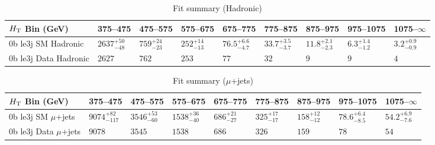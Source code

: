 \documentclass[8pt]{article}
\def\scalht{\mbox{$H_{\rm{T}}$}\xspace}
\newcommand\T{\rule{0pt}{2.6ex}}
\begin{document}
\begin{table}[ht!]
\caption{Fit summary (Hadronic)}
\label{tab:ensemble-summary}
\centering
\begin{tabular}{ lllllllll }

\hline
\scalht Bin (GeV)       & 375--475                       & 475--575                       & 575--675                       & 675--775                       & 775--875                       & 875--975                       & 975--1075                      & 1075--$\infty$                 \\ [1.000000ex]
\hline
0b le3j SM Hadronic\T   & $2637^{+50}_{-48}$             & $759^{+24}_{-23}$              & $252^{+14}_{-13}$              & $76.5^{+6.6}_{-4.7}$           & $33.7^{+3.5}_{-3.7}$           & $11.8^{+2.1}_{-2.3}$           & $6.3^{+1.4}_{-1.2}$            & $3.2^{+0.9}_{-0.9}$            \\ 
0b le3j Data Hadronic\T & $2627$                         & $762$                          & $253$                          & $77$                           & $32$                           & $9$                            & $9$                            & $4$                            \\ 
\hline

\end{tabular}
\end{table}
\begin{table}[ht!]
\caption{Fit summary ($\mu$+jets)}
\label{tab:ensemble-summary}
\centering
\begin{tabular}{ lllllllll }

\hline
\scalht Bin (GeV)       & 375--475                       & 475--575                       & 575--675                       & 675--775                       & 775--875                       & 875--975                       & 975--1075                      & 1075--$\infty$                 \\ [1.000000ex]
\hline
0b le3j SM $\mu$+jets\T & $9074^{+82}_{-117}$            & $3546^{+53}_{-60}$             & $1538^{+36}_{-40}$             & $686^{+21}_{-27}$              & $325^{+17}_{-17}$              & $158^{+12}_{-12}$              & $78.6^{+6.4}_{-8.5}$           & $54.2^{+6.9}_{-7.6}$           \\ 
0b le3j Data $\mu$+jets\T & $9078$                         & $3545$                         & $1538$                         & $686$                          & $326$                          & $159$                          & $78$                           & $54$                           \\ 
\hline

\end{tabular}
\end{table}
\end{document}
